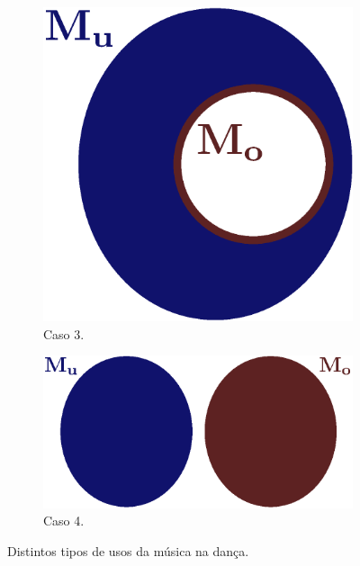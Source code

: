 \begin{figure}[ht]
\begin{subfigure}{.28\textwidth}
  \centering
  \includegraphics[width=.9\linewidth]{chapters/cap-musicalidade/musicalidade-it3.eps}  
  \caption{Caso 3.}
  \label{fig:ex:infomutua:c}
\end{subfigure}
\hfill
\begin{subfigure}{.52\textwidth}
  \centering
  \includegraphics[width=.9\linewidth]{chapters/cap-musicalidade/musicalidade-type3.eps}  
  \caption{Caso 4.}
  \label{fig:ex:infomutua:d}
\end{subfigure}
\caption{Distintos tipos de usos da música na dança.}
\label{fig:ex:infomutua}
\end{figure}

